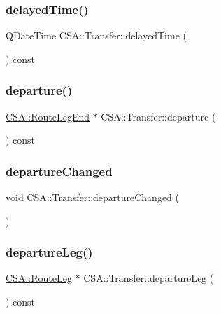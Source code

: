 \subsubsection{\texorpdfstring{delayed\+Time()}{delayedTime()}}
{\footnotesize\ttfamily Q\+Date\+Time C\+S\+A\+::\+Transfer\+::delayed\+Time (\begin{DoxyParamCaption}{ }\end{DoxyParamCaption}) const}

\mbox{\label{classCSA_1_1Transfer_a1442b93dece142706ed8657f1fa9e093}} 
\subsubsection{\texorpdfstring{departure()}{departure()}}
{\footnotesize\ttfamily \mbox{\hyperlink{classCSA_1_1RouteLegEnd}{C\+S\+A\+::\+Route\+Leg\+End}} $\ast$ C\+S\+A\+::\+Transfer\+::departure (\begin{DoxyParamCaption}{ }\end{DoxyParamCaption}) const}

\mbox{\label{classCSA_1_1Transfer_aa7bd4b7ccdba500719b18b0e0f534cb3}} 
\subsubsection{\texorpdfstring{departure\+Changed}{departureChanged}}
{\footnotesize\ttfamily void C\+S\+A\+::\+Transfer\+::departure\+Changed (\begin{DoxyParamCaption}{ }\end{DoxyParamCaption})\hspace{0.3cm}{\ttfamily [signal]}}

\mbox{\label{classCSA_1_1Transfer_a7f2d02a0a1fe7ca96f57fc7864ebfdb8}} 
\subsubsection{\texorpdfstring{departure\+Leg()}{departureLeg()}}
{\footnotesize\ttfamily \mbox{\hyperlink{classCSA_1_1RouteLeg}{C\+S\+A\+::\+Route\+Leg}} $\ast$ C\+S\+A\+::\+Transfer\+::departure\+Leg (\begin{DoxyParamCaption}{ }\end{DoxyParamCaption}) const}

